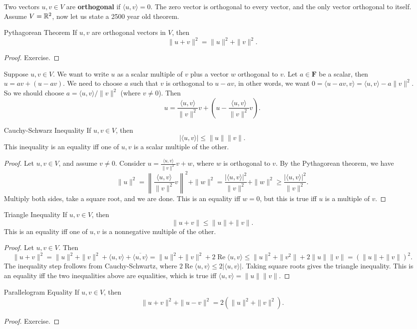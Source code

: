 Two vectors $u,v\in V$ are \textbf{orthogonal} if $\langle u,v \rangle =0$. The zero vector is orthogonal to every vector, and the only vector orthogonal to itself. Assume $V=\mathbb{R}^2$, now let us state a 2500 year old theorem.
\begin{namedthm}{Pythagorean Theorem}
   If $u,v$ are orthogonal vectors in $V$, then \[
   \|u+v\|^2=\|u\|^2+\|v\|^2.
   \]  
\end{namedthm}
\begin{proof}
    Exercise.
\end{proof}
Suppose $u,v\in V$. We want to write $u$ as a scalar multiple of $v$ plus a vector $w$ orthogonal to $v$. Let $a\in \mathbf F$ be a scalar, then $u=av+(u-av)$. We need to choose $a$ such that $v$ is orthogonal to $u-av$, in other words, we want $0=\langle u-av,v \rangle =\langle u,v \rangle -a\|v\|^2$. So we should choose $a= \langle u,v \rangle / \|v\|^2$ (where $v\neq 0$). Then \[
    u= \frac{\langle u,v \rangle }{\|v\|^2}v+\left( u- \frac{\langle u,v \rangle }{\|v\|^2} v\right) .
\] 
\begin{namedthm}{Cauchy-Schwarz Inequality}
   If $u,v\in V$, then \[
   | \langle u,v \rangle | \leq \|u\|\|v\|.
   \]  This inequality is an equality iff one of $u,v$ is a scalar multiple of the other.
\end{namedthm}
\begin{proof}
    Let $u,v\in V$, and assume $v\neq 0$. Consider $u= \frac{\langle u,v \rangle }{\|v\|^2}v+w$, where $w$ is orthogonal to $v$. By the Pythagorean theorem, we have \[
    \|u\|^2= \left\| \frac{\langle u,v \rangle }{\|v\|^2}v \right\|^2+\|w\|^2= \frac{| \langle u,v \rangle |^2}{\|v\|^2}+\|w\|^2 \geq \frac{|\langle u,v \rangle |^2}{\|v\|^2}.
    \] Multiply both sides, take a square root, and we are done. This is an equality iff $w=0$, but this is true iff $u$ is a multiple of $v$.
\end{proof}
\begin{namedthm}{Triangle Inequality}
   If $u,v\in V$, then \[
   \|u+v\|\leq \|u\|+\|v\|.
   \]  This is an equality iff one of $u,v$ is a nonnegative multiple of the other.
\end{namedthm}
\begin{proof}
    Let $u,v\in V$. Then \[
        \|u+v\|^2=\|u\|^2+\|v\|^2+\langle u,v \rangle +\overline{\langle u,v \rangle } =\|u\|^2+\|v\|^2+2 \operatorname{Re}\langle u,v \rangle \leq \|u\|^2+\|v^2\|+2\|u\|\|v\|=\left( \|u\|+\|v\| \right) ^2.
    \] The inequality step frollows from Cauchy-Schwartz, where $2 \operatorname{Re}\langle u,v \rangle \leq 2 |\langle u,v \rangle |$. Taking square roots gives the triangle inequality. This is an equality iff the two inequalities above are equalities, which is true iff $\langle u,v \rangle =\|u\|\|v\|$.
\end{proof}
\begin{namedthm}{Parallelogram Equality}
   If $u,v\in V$, then \[
       \|u+v\|^2+\|u-v\|^2=2\left( \|u\|^2+\|v\|^2 \right) .
   \]  
\end{namedthm}
\begin{proof}
    Exercise.
\end{proof}
